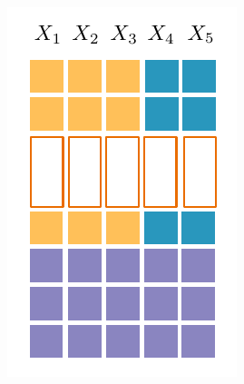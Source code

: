 \documentclass[final]{beamer}
\begin{document}
\begin{frame}{}
\begin{textblock}{60}
\begin{minipage}[t]{5.1516cm}
    \includegraphics[width=\linewidth]{figures/grid-3}                                                               \end{minipage}\hspace{30pt}
\end{textblock}
\end{frame}
\end{document}
